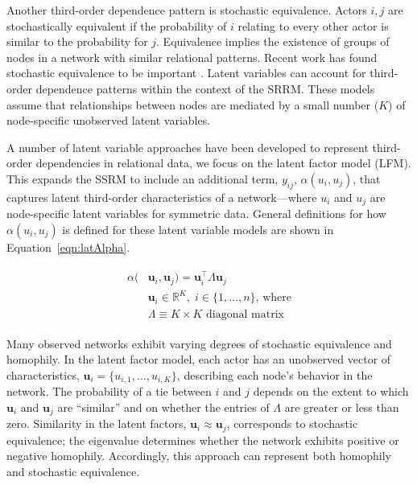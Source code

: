 \documentclass[12pt]{amsart}
\begin{document}
Another third-order dependence pattern is stochastic equivalence. Actors $i,j$ are stochastically equivalent if the probability of $i$ relating to every other actor is similar to the probability for $j$. Equivalence implies the existence of groups of nodes in a network with similar relational patterns.  Recent work has found stochastic equivalence to be important \citep{manger:etal:2012}. Latent variables can account for third-order dependence patterns within the context of the SRRM. These models assume that relationships between nodes are mediated by a small number ($K$) of node-specific unobserved latent variables. 

A number of latent variable approaches have been developed to represent third-order dependencies in relational data, we focus on the latent factor model (LFM). This expands the SSRM to include an additional term, $y_{ij}$, $\alpha(u_{i}, u_{j})$, that captures latent third-order characteristics of a network---where $u_{i}$ and $u_{j}$ are node-specific latent variables for symmetric data. General definitions for how $\alpha(u_{i}, u_{j})$ is defined for these latent variable models are shown in Equation~\ref{eqn:latAlpha}. 

\begin{align}
\begin{aligned}
	\alpha(&\textbf{u}_{i}, \textbf{u}_{j}) = \textbf{u}_{i}^{\top} \Lambda \textbf{u}_{j} \\
	&\textbf{u}_{i} \in \mathbb{R}^{K}, \; i \in \{1, \ldots, n \} \text{, where}\\
	 &\Lambda \equiv K \times K \text{ diagonal matrix}
\label{eqn:latAlpha}
\end{aligned}
\end{align}

Many observed  networks exhibit varying degrees of stochastic equivalence and homophily.  In the latent factor model, each actor has an unobserved vector of characteristics, $\textbf{u}_{i} = \{u_{i,1}, \ldots, u_{i,K} \}$, describing each node's behavior in the network. The probability of a tie between $i$ and $j$ depends on the extent to which $\textbf{u}_{i}$ and $\textbf{u}_{j}$ are ``similar'' and on whether the entries of $\Lambda$ are greater or less than zero. Similarity in the latent factors, $\textbf{u}_{i} \approx \textbf{u}_{j}$, corresponds to stochastic equivalence; the eigenvalue determines whether the network exhibits positive or negative homophily. Accordingly, this approach can represent both homophily and stochastic equivalence. 
\end{document}
